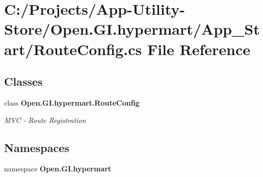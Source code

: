 \section{C\+:/\+Projects/\+App-\/\+Utility-\/\+Store/\+Open.G\+I.\+hypermart/\+App\+\_\+\+Start/\+Route\+Config.cs File Reference}
\label{_route_config_8cs}
\subsection*{Classes}
\begin{DoxyCompactItemize}
\item 
class \textbf{ Open.\+G\+I.\+hypermart.\+Route\+Config}
\begin{DoxyCompactList}\small\item\em M\+VC -\/ Route Registration \end{DoxyCompactList}\end{DoxyCompactItemize}
\subsection*{Namespaces}
\begin{DoxyCompactItemize}
\item 
namespace \textbf{ Open.\+G\+I.\+hypermart}
\end{DoxyCompactItemize}
